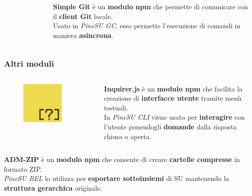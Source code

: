 \documentclass{beamer}
\begin{document}
\begin{frame}
\begin{columns}
\begin{figure}
		\end{figure} 
		\textbf{Simple Git} è un \textbf{modulo npm} che permette di
		comunicare con il \textbf{client Git} locale. \\
		\smallskip
		Usato in \emph{PineSU GC}, esso permette l'esecuzione di
		comandi in maniera \textbf{asincrona}. \\
	\end{columns}
\end{frame}

\begin{frame}
	\frametitle{Altri moduli}
	\begin{columns}
		\centering
		\begin{figure}
			\includegraphics[width=0.75\textwidth]{figures/inquirer.png}
		\end{figure} 
		\textbf{Inquirer.js} è un \textbf{modulo npm} che facilita
		la creazione di \textbf{interfacce utente} tramite menù testuali. \\
		\smallskip
		In \emph{PineSU CLI} viene usato per \textbf{interagire}
		con l'utente ponendogli \textbf{domande} dalla risposta chiusa o aperta. \\
	\end{columns}
	\medskip
	\begin{columns}
		\column{0.72\textwidth}
		\textbf{ADM-ZIP} è un \textbf{modulo npm} che consente di
		creare \textbf{cartelle compresse} in formato ZIP.\\
		\smallskip
		\emph{PineSU BEL} lo utilizza per \textbf{esportare sottoinsiemi} di
		SU mantenendo la \textbf{struttura gerarchica} originale. \\

\end{columns}
\end{frame}
\end{document}
